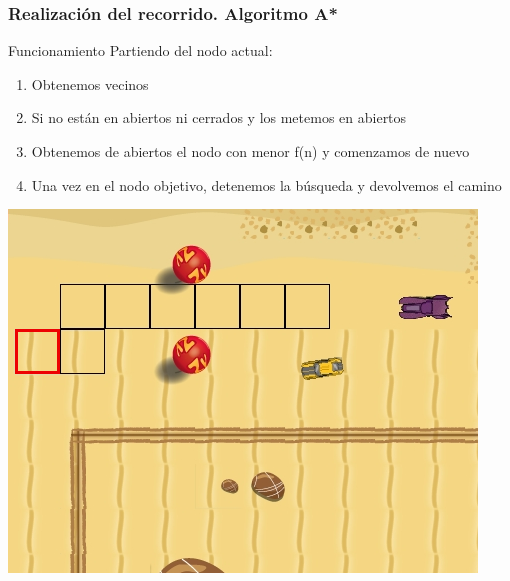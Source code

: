 \begin{frame}
    \frametitle{Realización del recorrido. Algoritmo A*}

    
        \begin{block}{Funcionamiento}
            Partiendo del nodo actual:
            \begin{enumerate}
                \item Obtenemos vecinos
                \item Si no están en abiertos ni cerrados y los metemos en abiertos
                \item Obtenemos de abiertos el nodo con menor f(n) y comenzamos de nuevo 
                \item Una vez en el nodo objetivo, detenemos la búsqueda y devolvemos el camino
            \end{enumerate}
        \end{block}
        
        \begin{center}
                \includegraphics[scale=0.3]{imagenes/a*_ejemplo.png}
        \end{center}
    

\end{frame}

